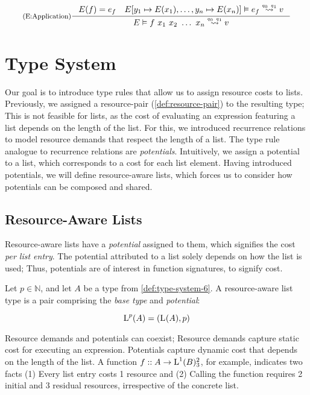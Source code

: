 \[
   \inference[(E:Application)]
   {E(f) = e_f 
   \quad 
   \evals{E[y_1 \mapsto E(x_1), \dots, y_n \mapsto E(x_n)]}{e_f}{v}{q_0}{q_1}}
   {\evals{E}{f~x_1~x_2~\dots~x_n}{v}{q_0}{q_1}}
\]

\section{Type System}

Our goal is to introduce type rules that allow us to assign resource costs to lists. Previously, we assigned a resource-pair (\cref{def:resource-pair}) to the resulting type; This is not feasible for lists, as the cost of evaluating an expression featuring a list depends on the length of the list. For this, we introduced recurrence relations to model resource demands that respect the length of a list. The type rule analogue to recurrence relations are \emph{potentials}. Intuitively, we assign a potential to a list, which corresponds to a cost for each list element. Having introduced potentials, we will define resource-aware lists, which forces us to consider how potentials can be composed and shared.

\subsection{Resource-Aware Lists}\label{sec:resource-aware-lists}

Resource-aware lists have a \emph{potential} assigned to them, which signifies the cost \emph{per list entry}. The potential attributed to a list solely depends on how the list is used; Thus, potentials are of interest in function signatures, to signify cost. 

\begin{definition}\label{def:ra-list}
   Let \(p \in \mathbb{N}\), and let \(A\) be a type from \cref{def:type-system-6}. A resource-aware list type is a pair comprising the \emph{base type} and \emph{potential}:

   \[
      \text{L}^{p}(A) = (\text{L}^{}(A), p)
   \]
\end{definition}

\begin{remark}
   Resource demands and potentials can coexist; Resource demands capture static cost for executing an expression. Potentials capture dynamic cost that depends on the length of the list. A function \(f :: A \to \text{L}^{1}(B) ^{2}_{3}\), for example, indicates two facts (1) Every list entry costs 1 resource and (2) Calling the function requires 2 initial and 3 residual resources, irrespective of the concrete list.
\end{remark}

